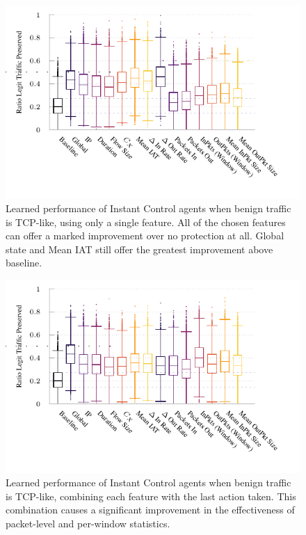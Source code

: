 \documentclass[10pt, times, conference, letterpaper]{IEEEtran}
\begin{document}
\begin{figure}
	\centering
	\includegraphics[width=0.9\linewidth]{../plots/ftprep-tcp-cap-box}
	\vspace{-1cm}
	\caption{
		Learned performance of Instant Control agents when benign traffic is TCP-like, using only a single feature.
		All of the chosen features can offer a marked improvement over no protection at all.
		Global state and Mean IAT still offer the greatest improvement above baseline.
		\vspace{-1em}
		\label{fig:tcp-cap-feature-plots}
	}
\end{figure}

\begin{figure}
	\centering
	\includegraphics[width=0.9\linewidth]{../plots/ftprep-tcp-laf-cap-box}
	\vspace{-1cm}
	\caption{
		Learned performance of Instant Control agents when benign traffic is TCP-like, combining each feature with the last action taken.
		This combination causes a significant improvement in the effectiveness of packet-level and per-window statistics.
		\label{fig:tcp-laf-feature-plots}
	}
\end{figure}
\end{document}
